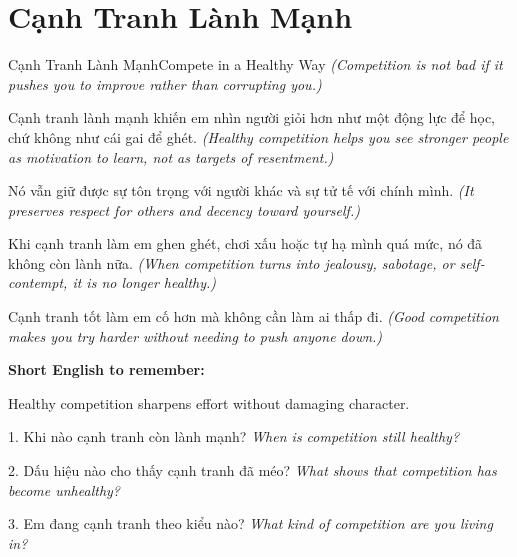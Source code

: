 \section{Cạnh Tranh Lành Mạnh}
\begin{truyen}{Cạnh Tranh Lành Mạnh}{Compete in a Healthy Way}
\textit{(Competition is not bad if it pushes you to improve rather than corrupting you.)}

Cạnh tranh lành mạnh khiến em nhìn người giỏi hơn như một động lực để học, chứ không như cái gai để ghét.
\textit{(Healthy competition helps you see stronger people as motivation to learn, not as targets of resentment.)}

Nó vẫn giữ được sự tôn trọng với người khác và sự tử tế với chính mình.
\textit{(It preserves respect for others and decency toward yourself.)}

Khi cạnh tranh làm em ghen ghét, chơi xấu hoặc tự hạ mình quá mức, nó đã không còn lành nữa.
\textit{(When competition turns into jealousy, sabotage, or self-contempt, it is no longer healthy.)}
\end{truyen}

\begin{baihoc}
Cạnh tranh tốt làm em cố hơn mà không cần làm ai thấp đi.
\textit{(Good competition makes you try harder without needing to push anyone down.)}
\end{baihoc}

\begin{ghinhoanh}
\textbf{Short English to remember:}

Healthy competition sharpens effort without damaging character.

\end{ghinhoanh}

\begin{tuhocnhanh}
1. Khi nào cạnh tranh còn lành mạnh? \textit{When is competition still healthy?}

2. Dấu hiệu nào cho thấy cạnh tranh đã méo? \textit{What shows that competition has become unhealthy?}

3. Em đang cạnh tranh theo kiểu nào? \textit{What kind of competition are you living in?}
\end{tuhocnhanh}
\ngancach

